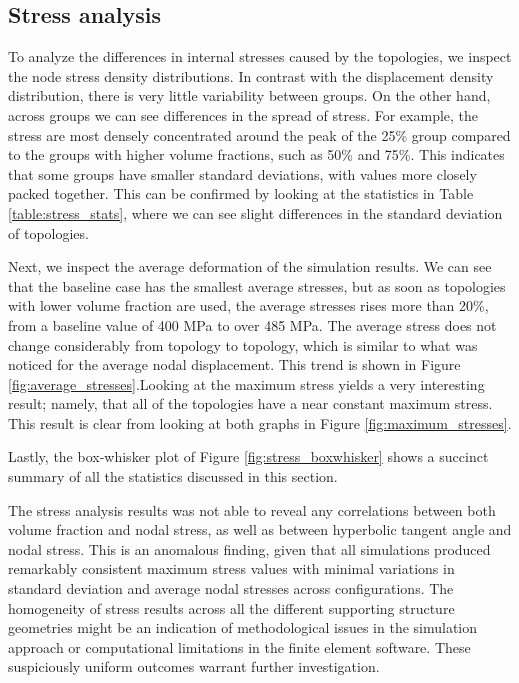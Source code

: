 \documentclass[../main.tex]{subfiles}
\begin{document}
\clearpage
\subsection{Stress analysis}

To analyze the differences in internal stresses caused by the topologies, we inspect the node stress density distributions. In contrast with the displacement density distribution, there is very little variability between groups. On the other hand, across groups we can see differences in the spread of stress. For example, the stress are most densely concentrated around the peak of the 25\% group compared to the groups with higher volume fractions, such as 50\% and 75\%. This indicates that some groups have smaller standard deviations, with values more closely packed together. This can be confirmed by looking at the statistics in  
Table \ref{table:stress_stats}, where we can see slight differences in the standard deviation of topologies.

Next, we inspect the average deformation of the simulation results. We can see that the baseline case has the smallest average stresses, but as soon as topologies with lower volume fraction are used, the average stresses rises more than 20\%, from a baseline value of 400 MPa to over 485 MPa. The average stress does not change considerably from topology to topology, which is similar to what was noticed for the average nodal displacement. This trend is shown in Figure \ref{fig:average_stresses}.Looking at the maximum stress yields a very interesting result; namely, that all of the topologies have a near constant maximum stress. This result is clear from looking at both graphs in Figure \ref{fig:maximum_stresses}.

Lastly, the box-whisker plot of Figure \ref{fig:stress_boxwhisker} shows a succinct summary of all the statistics discussed in this section.

The stress analysis results was not able to reveal any correlations between both volume fraction and nodal stress, as well as between hyperbolic tangent angle and nodal stress. This is an anomalous finding, given that all simulations produced remarkably consistent maximum stress values with minimal variations in standard deviation and average nodal stresses across configurations. The homogeneity of stress results across all the different supporting structure geometries might be an indication of methodological issues in the simulation approach or computational limitations in the finite element software. These suspiciously uniform outcomes warrant further investigation.  
\end{document}
